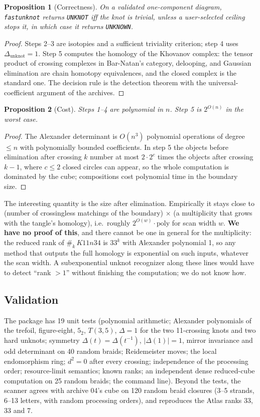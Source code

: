 \documentclass[11pt]{article}
\newtheorem{proposition}{Proposition}[section]
\theoremstyle{remark}
\newcommand{\code}[1]{\texttt{#1}}
\begin{document}
\begin{proposition}[Correctness]
On a validated one-component diagram, \code{fastunknot} returns \code{UNKNOT}
iff the knot is trivial, unless a user-selected ceiling stops it, in which
case it returns \code{UNKNOWN}.
\end{proposition}
\begin{proof}
Steps 2--3 are isotopies and a sufficient triviality criterion; step 4 uses
$\Delta_{\text{unknot}}=1$. Step 5 computes the homology of the Khovanov
complex: the tensor product of crossing complexes in Bar-Natan's category,
delooping, and Gaussian elimination are chain homotopy equivalences, and the
closed complex is the standard one. The decision rule is the detection theorem
with the universal-coefficient argument of the archives.
\end{proof}

\begin{proposition}[Cost]
Steps 1--4 are polynomial in $n$. Step 5 is $2^{O(n)}$ in the worst case.
\end{proposition}
\begin{proof}
The Alexander determinant is $O(n^3)$ polynomial operations of degree
$\le n$ with polynomially bounded coefficients. In step 5 the objects before
elimination after crossing $k$ number at most $2\cdot2^{c}$ times the objects
after crossing $k-1$, where $c\le2$ closed circles can appear, so the whole
computation is dominated by the cube; compositions cost polynomial time in the
boundary size.
\end{proof}

The interesting quantity is the size after elimination. Empirically it stays
close to (number of crossingless matchings of the boundary) $\times$ (a
multiplicity that grows with the tangle's homology), i.e.\ roughly
$2^{O(w)}\cdot\mathrm{poly}$ for scan width $w$. \textbf{We have no proof of
this}, and there cannot be one in general for the multiplicity: the reduced rank
of $\#_k\,K11n34$ is $33^k$ with Alexander polynomial 1, so any method that
outputs the full homology is exponential on such inputs, whatever the scan
width. A subexponential unknot recognizer along these lines would have to
detect ``rank $>1$'' without finishing the computation; we do not know how.

\subsection{Validation}
The package has 19 unit tests (polynomial arithmetic; Alexander polynomials
of the trefoil, figure-eight, $5_2$, $T(3,5)$, $\Delta=1$ for the two
11-crossing knots and two hard unknots; symmetry $\Delta(t)=\Delta(t^{-1})$,
$|\Delta(1)|=1$, mirror invariance and odd determinant on 40 random braids;
Reidemeister moves; the local endomorphism ring; $d^2=0$ after every
crossing; independence of the processing order; resource-limit semantics;
known ranks; an independent dense reduced-cube computation on 25 random
braids; the command line). Beyond the tests, the scanner agrees with archive
04's cube on 120 random braid closures (3--5 strands, 6--13 letters, with
random processing orders), and reproduces the Atlas ranks 33, 33 and 7.
\end{document}
